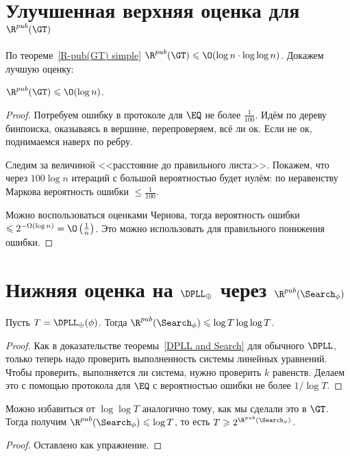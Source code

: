 \section{Улучшенная верхняя оценка для \texorpdfstring{$\R^{pub}(\GT)$}{R[pub](GT)}}

По теореме~\ref{R-pub(GT) simple} $\R^{pub}(\GT)\leqslant \O(\log n\cdot \log\log n)$. Докажем лучшую оценку:
\begin{theorem}
$\R^{pub}(\GT)\leqslant \O(\log n)$.
\end{theorem}
\begin{proof}
Потребуем ошибку в протоколе для $\EQ$ не более $\frac{1}{100}$.
Идём по дереву бинпоиска, оказываясь в вершине, перепроверяем, всё ли ок. Если не ок, поднимаемся наверх по ребру.

Следим за величиной <<расстояние до правильного листа>>.
Покажем, что через $100\log n$ итераций с большой вероятностью будет нулём: по неравенству Маркова вероятность ошибки $\leqslant \frac{1}{100}$.

Можно воспользоваться оценками Чернова, тогда вероятность ошибки $\leqslant 2^{-\Omega(\log n)} = \O\left(\frac{1}{n}\right)$. Это можно использовать для правильного понижения ошибки. 
\end{proof}

\section{Нижняя оценка на \texorpdfstring{$\DPLL_\oplus$}{DPLL(⊕)} через \texorpdfstring{$\R^{pub}(\Search_\phi)$}{R[pub](Search(φ))}}

\begin{theorem}
\label{DPLL-oplus and Search}
Пусть $T = \DPLL_{\oplus}(\phi)$.
Тогда $\R^{pub}(\Search_{\phi}) \leqslant \log T\log\log T$.
\end{theorem}
\begin{proof}
Как в доказательстве теоремы~\ref{DPLL and Search} для обычного $\DPLL$, только теперь надо проверить выполненность системы линейных уравнений.
Чтобы проверить, выполняется ли система, нужно проверить $k$ равенств.
Делаем это с помощью протокола для $\EQ$ с вероятностью ошибки не более $1/\log T$.
\end{proof}
\begin{remark}
Можно избавиться от $\log\log T$ аналогично тому, как мы сделали это в $\GT$.
Тогда получим $\R^{pub}(\Search_{\phi}) \leqslant \log T$, то есть $T\geqslant 2^{\R^{pub}(\Search_\phi)}$.
\end{remark}
\begin{proof}
Оставлено как упражнение.
\end{proof}